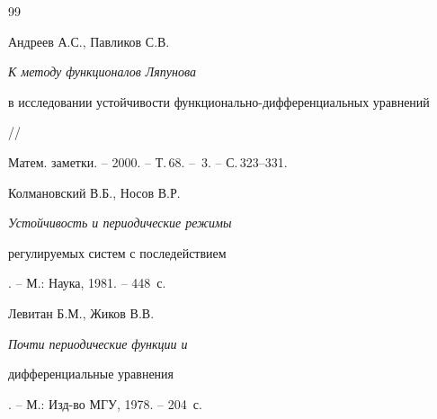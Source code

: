\begin{thebibliography}{99}


Андреев А.С., Павликов С.В. {\em К методу функционалов Ляпунова


в исследовании устойчивости функционально-дифференциальных уравнений} //


Матем. заметки. -- 2000. -- Т.\,68. -- \No\,3. -- С.\,323--331.




Колмановский В.Б., Носов В.Р. {\em Устойчивость и периодические режимы


регулируемых систем с последействием}. -- М.: Наука, 1981. -- 448~с.




Левитан Б.М., Жиков В.В. {\em Почти периодические функции и


дифференциальные уравнения}. --  М.: Изд-во МГУ, 1978. -- 204~с.





\end{thebibliography}





\vskip 2cm












\label{end}











